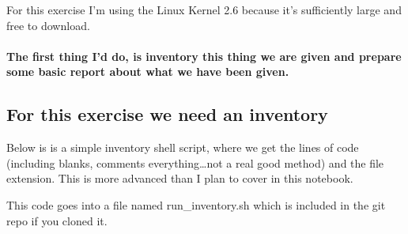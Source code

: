 \documentclass{article}
\begin{document}
For this exercise I'm using the Linux Kernel 2.6 because it's
sufficiently large and free to download. \\

\paragraph{The first thing I'd do, is inventory this thing we are given
and prepare some basic report about what we have been
given.}\label{the-first-thing-id-do-is-inventory-this-thing-we-are-given-and-prepare-some-basic-report-about-what-we-have-been-given.}

    \subsection{For this exercise we need an
inventory}\label{for-this-exercise-we-need-an-inventory}

Below is is a simple inventory shell script, where we get the lines of
code (including blanks, comments everything\ldots{}not a real good
method) and the file extension. This is more advanced than I plan to
cover in this notebook.

This code goes into a file named run\_inventory.sh which is included in
the git repo if you cloned it.
\end{document}
